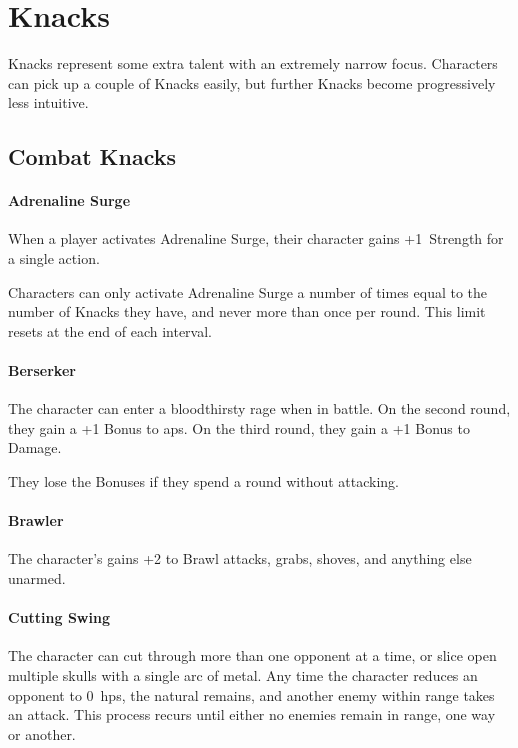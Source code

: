 \chapter[Hall of Knacks]{Knacks}
\label{knacks}

Knacks represent some extra talent with an extremely narrow focus.
Characters can pick up a couple of Knacks easily, but further Knacks become progressively less intuitive.

\section{Combat Knacks}

\begin{multicols}{2}

\subsubsection{Adrenaline Surge}
\label{adrenalinesurge}

When a player activates Adrenaline Surge, their character gains +1~Strength for a single action.

Characters can only activate Adrenaline Surge a number of times equal to the number of Knacks they have, and never more than once per round.
This limit resets at the end of each \gls{interval}.

\subsubsection{Berserker}

The character can enter a bloodthirsty rage when in battle.
On the second round, they gain a +1 Bonus to \glspl{ap}.
On the third round, they gain a +1 Bonus to Damage.

They lose the Bonuses if they spend a round without attacking.

\subsubsection{Brawler}

The character's gains +2 to Brawl attacks, grabs, shoves, and anything else unarmed.

\subsubsection{Cutting Swing}

The character can cut through more than one opponent at a time, or slice open multiple skulls with a single arc of metal.
Any time the character reduces an opponent to 0~\glspl{hp}, the \gls{natural} remains, and another enemy within range takes an attack.
This process recurs until either no enemies remain in range, one way or another.


\end{multicols}
